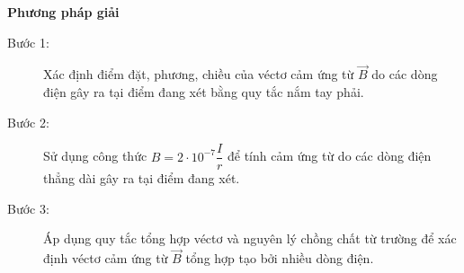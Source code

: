 \textbf{Phương pháp giải}
\begin{description}
	
	\item[Bước 1:] Xác định điểm đặt, phương, chiều của véctơ cảm ứng từ $\vec{B}$ do các dòng điện gây ra tại điểm đang xét bằng quy tắc nắm tay phải.
	
	\item[Bước 2:] Sử dụng công thức $B=2\cdot 10^{-7}\dfrac{I}{r}$ để tính cảm ứng từ do các dòng điện thẳng dài gây ra tại điểm đang xét.
	\item[Bước 3:] Áp dụng quy tắc tổng hợp véctơ và nguyên lý chồng chất từ trường để xác định véctơ cảm ứng từ $\vec{B}$ tổng hợp tạo bởi nhiều dòng điện.
	
	
\end{description}
 
